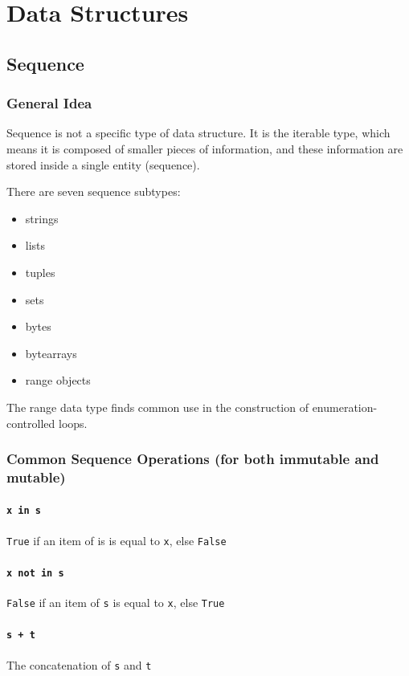 \documentclass[12pt]{book}
\begin{document}
\chapter{Data Structures}
\label{sec:org7aa12a6}
\section{Sequence}
\label{sec:orge371eaf}
\subsection{General Idea}
\label{sec:orgdf30d41}
Sequence is not a specific type of data structure. It is the iterable type, which means it is composed of smaller pieces of information, and these information are stored inside a single entity (sequence).

There are seven sequence subtypes:
\begin{itemize}
\item strings
\item lists
\item tuples
\item sets
\item bytes
\item bytearrays
\item range objects
\end{itemize}

The range data type finds common use in the construction of enumeration-controlled loops.
\subsection{Common Sequence Operations (for both immutable and mutable)}
\label{sec:org87b0aaf}
\subsubsection{\texttt{x in s}}
\label{sec:org7a65286}
\texttt{True} if an item of is is equal to \texttt{x}, else \texttt{False}
\subsubsection{\texttt{x not in s}}
\label{sec:org69b4f72}
\texttt{False} if an item of \texttt{s} is equal to \texttt{x}, else \texttt{True}
\subsubsection{\texttt{s + t}}
\label{sec:orgf9b5a42}
The concatenation of \texttt{s} and \texttt{t}
\end{document}
